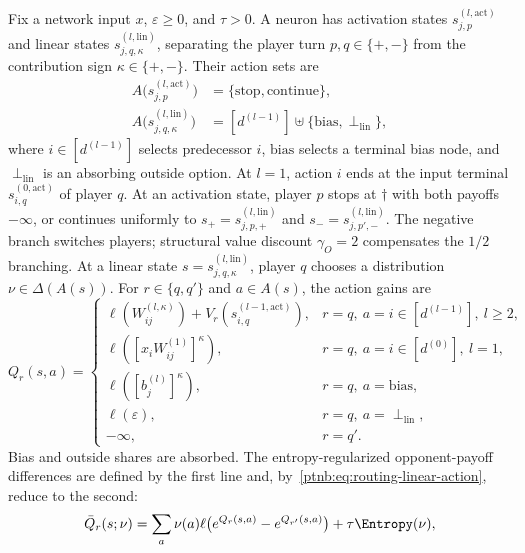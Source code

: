 \begin{definition}\label{ptnb:def:routing-recursion}
Fix a network input $x$, $\varepsilon\geq0$, and $\tau>0$. A neuron has activation states $s_{j,p}^{(l,\mathrm{act})}$ and linear states $s_{j,q,\kappa}^{(l,\mathrm{lin})}$, separating the player turn $p,q\in\{+,-\}$ from the contribution sign $\kappa\in\{+,-\}$. Their action sets are
\[
\begin{aligned}
 A\bigl(s_{j,p}^{(l,\mathrm{act})}\bigr)&=\{\mathrm{stop},\mathrm{continue}\},\\
 A\bigl(s_{j,q,\kappa}^{(l,\mathrm{lin})}\bigr)&=[d^{(l-1)}]\uplus\{\mathrm{bias},\perp_{\mathrm{lin}}\},
\end{aligned}
\]
where $i\in[d^{(l-1)}]$ selects predecessor $i$, $\mathrm{bias}$ selects a terminal bias node, and $\perp_{\mathrm{lin}}$ is an absorbing outside option. At $l=1$, action $i$ ends at the input terminal $s_{i,q}^{(0,\mathrm{act})}$ of player $q$.
At an activation state, player $p$ stops at $\dagger$ with both payoffs $-\infty$, or continues uniformly to $s_+=s_{j,p,+}^{(l,\mathrm{lin})}$ and $s_-=s_{j,p',-}^{(l,\mathrm{lin})}$. The negative branch switches players; structural value discount $\gamma_O=2$ compensates the $1/2$ branching.
At a linear state $s=s_{j,q,\kappa}^{(l,\mathrm{lin})}$, player $q$ chooses a distribution $\nu\in\Delta(A(s))$. For $r\in\{q,q'\}$ and $a\in A(s)$, the action gains are
\begin{equation}\label{ptnb:eq:routing-linear-action}
 Q_r(s,a)=\begin{cases}
 \ell(W_{ij}^{(l,\kappa)})+V_r(s_{i,q}^{(l-1,\mathrm{act})}),&r=q,\ a=i\in[d^{(l-1)}],\ l\geq2,\\
 \ell([x_iW_{ij}^{(1)}]^\kappa),&r=q,\ a=i\in[d^{(0)}],\ l=1,\\
 \ell([b_j^{(l)}]^\kappa),&r=q,\ a=\mathrm{bias},\\
 \ell(\varepsilon),&r=q,\ a=\perp_{\mathrm{lin}},\\
 -\infty,&r=q'.
 \end{cases}
\end{equation}
Bias and outside shares are absorbed. The entropy-regularized opponent-payoff differences are defined by the first line and, by~\eqref{ptnb:eq:routing-linear-action}, reduce to the second:
\begin{align}\label{ptnb:eq:optimal-linear}
 \bar Q_r(s;\nu)&=\sum_a\nu(a)\ell\bigl(e^{Q_r(s,a)}-e^{Q_{r'}(s,a)}\bigr)+\tau\Entropy(\nu),\nonumber\\

\end{align}
\end{definition}
